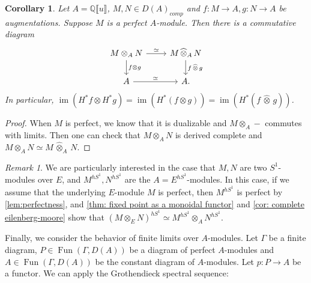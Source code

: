 \documentclass[11pt]{amsart}
\numberwithin{equation}{section}
\theoremstyle{plain}
\newtheorem{Coro}[coro]{Corollary}
\theoremstyle{definition}
\theoremstyle{remark}
\newtheorem{RMK}[rmk]{Remark}
\newcommand{\bQ} { {\mathbb{Q}}}
\newcommand{\fpw}[1]{{\llbracket #1\rrbracket}}
\newcommand\Fun{\operatorname{Fun}}
\newcommand\im{ {\operatorname{im}} }
\begin{document}
\begin{Coro}\label{cor: complete eilenberg-moore}
Let $A = \bQ\fpw{u}$, $M, N \in D(A)_{comp}$ and $f: M \to A, g: N \to A$ be augmentations. Suppose $M$ is a perfect $A$-module. Then there is a commutative diagram
\[\begin{tikzcd}
{M \otimes_A N} \arrow[r,"{\simeq}"] \arrow[d,"{f\otimes g}"] & {M \,\widehat{\otimes}_A\, N} \arrow[d, "{f \,\widehat{\otimes}\,g}"] \\
A \arrow[r,"{\simeq}"] & A.
\end{tikzcd}\]
In particular, $\im(H^*f \otimes H^*g) = \im(H^*(f \otimes g))= \im(H^*(f \,\widehat\otimes\, g))$.
\end{Coro}
\begin{proof}
When $M$ is perfect, we know that it is dualizable and $M \otimes_A -$ commutes with limits. Then one can check that $M \otimes_A N$ is derived complete and $M \otimes_A N \simeq M\,\widehat\otimes_A\,N$.
\end{proof}
\begin{RMK}We are particularly interested in the case that $M,N$ are two
$S^1$-modules over $E$, and $M^{hS^1}, N^{hS^1}$ are the 
$A=E^{hS^1}$-modules. In this case, if we assume that the underlying $E$-module $M$ is perfect, then $M^{hS^1}$ is perfect by \autoref{lem:perfectness}, and \autoref{thm: fixed point as a monoidal functor} and \autoref{cor: complete eilenberg-moore} show that $(M\otimes_E N)^{hS^1}\simeq M^{hS^1} \otimes_A N^{hS^1}$.
\end{RMK}

Finally, we consider the behavior of finite limits over $A$-modules. Let $\Gamma$ be a finite diagram, $P \in \Fun(\Gamma, D(A))$ be a diagram of perfect $A$-modules and $A \in \Fun(\Gamma, D(A))$ be the constant diagram of $A$-modules. Let $p: P \to A$ be a functor. We can apply the Grothendieck spectral sequence:
\end{document}
